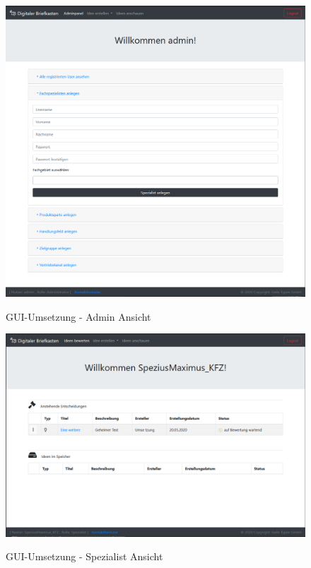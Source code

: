 \begin{figure}[h]
    \centering
    \begin{minipage}[t]{1\textwidth}
        \caption{GUI-Umsetzung - Admin Ansicht }
        \includegraphics[width=1\textwidth]{img/admin-umsetzung.png}\\
    \end{minipage}
\end{figure}

\begin{figure}[h]
    \centering
    \begin{minipage}[t]{1\textwidth}
        \caption{GUI-Umsetzung - Spezialist Ansicht }
        \includegraphics[width=1\textwidth]{img/spezialist-umsetzung.png}\\
    \end{minipage}
\end{figure}

